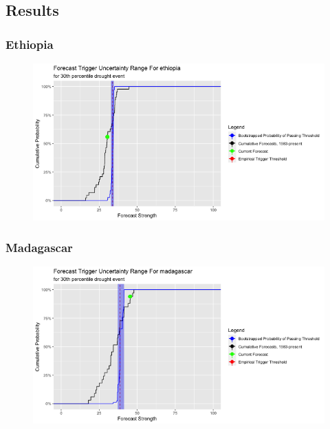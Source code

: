 \documentclass{ametsocV5}
\begin{document}
\subsection{Results}




\subsubsection{Ethiopia}

\begin{figure}
    \centering
    \includegraphics[width=0.9\linewidth]{figures/ethiopia.png}
\end{figure}

\subsubsection{Madagascar}

\begin{figure}
    \centering
    \includegraphics[width=0.9\linewidth]{figures/madagascar.png}
\end{figure}
\end{document}
